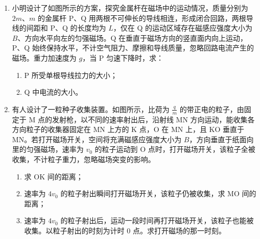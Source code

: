 \documentclass[\gkver]{gaokaozhenti}
\begin{document}
\begin{enumerate}
\item
小明设计了如图所示的方案，探究金属杆在磁场中的运动情况，质量分别为 $2m$、$m$ 的金属杆 P、Q 用两根不可伸长的导线相连，形成闭合回路，两根导线的间距和 P、Q 的长度均为 $L$，仅在 Q 的运动区域存在磁感应强度大小为 $B$、方向水平向左的匀强磁场。Q 在垂直于磁场方向的竖直面内向上运动，P、Q 始终保持水平，不计空气阻力、摩擦和导线质量，忽略回路电流产生的磁场。重力加速度为 $g$，当 P 匀速下降时，求：
\begin{enumerate}
	\item
	P 所受单根导线拉力的大小；
	\item
	Q 中电流的大小。
\end{enumerate}

\item
有人设计了一粒种子收集装置。如图所示，比荷为 $\frac{q}{m}$ 的带正电的粒子，由固定于 M 点的发射枪，以不同的速率射出后，沿射线 MN 方向运动，能收集各方向粒子的收集器固定在 MN 上方的 K 点，O 在 MN 上，且 KO 垂直于 MN。若打开磁场开关，空间将充满磁感应强度大小为 $B$，方向垂直于纸面向里的匀强磁场，速率为 $v_{0}$ 的粒子运动到 O 点时，打开磁场开关，该粒子全被收集，不计粒子重力，忽略磁场突变的影响。
\begin{enumerate}
	\item
	求 OK 间的距离；
	\item
	速率为 $4v_{0}$ 的粒子射出瞬间打开磁场开关，该粒子仍被收集，求 MO 间的距离；
	\item
	速率为 $4v_{0}$ 的粒子射出后，运动一段时间再打开磁场开关，该粒子也能被收集。以粒子射出的时刻为计时 0 点。求打开磁场的那一时刻。
\end{enumerate}
\end{enumerate}
\end{document}
